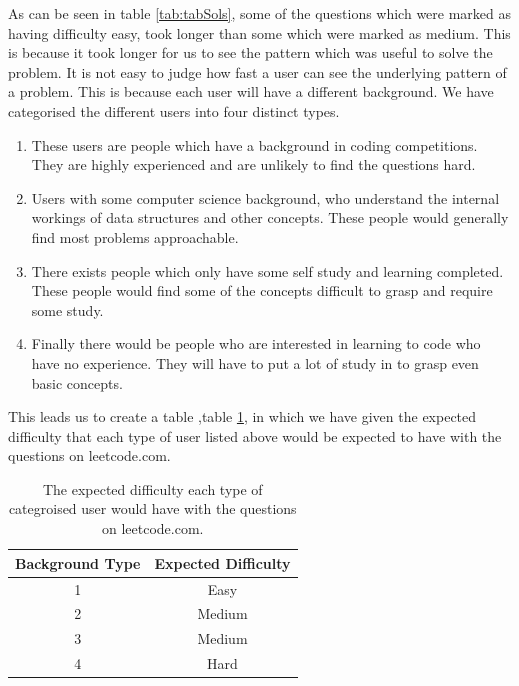 \documentclass[10pt,twocolumn]{IEEEtran}
\begin{document}
\par As can be seen in table \ref{tab:tabSols}, some of the questions which were marked as having difficulty easy, took longer than some which were marked as medium. This is because it took longer for us to see the pattern which was useful to solve the problem. It is not easy to judge how fast a user can see the underlying pattern of a problem. This is because each user will have a different background. We have categorised the different users into four distinct types. 
\begin{enumerate}
\item{These users are people which have a background in coding competitions. They are highly experienced and are unlikely to find the questions hard.}
\item{Users with some computer science background, who understand the internal workings of data structures and other concepts. These people would generally find most problems approachable.}
\item{There exists people which only have some self study and learning completed. These people would find some of the concepts difficult to grasp and require some study.}
\item{Finally there would be people who are interested in learning to code who have no experience. They will have to put a lot of study in to grasp even basic concepts.}
\end{enumerate}
This leads us to create a table ,table \ref{tab:difficulty}, in which we have given the expected difficulty that each type of user listed above would be expected to have with the questions on leetcode.com.
\begin{table}[t]
\centering
	\begin{tabular}{| c | c |} \hline
		   Background Type &Expected Difficulty \\ \hline
		1 & Easy \\ \hline
		2 & Medium \\ \hline
		3 & Medium  \\ \hline
		4 & Hard  \\ \hline
	\end{tabular}
	\caption{The expected difficulty each type of categroised user would have with the questions on leetcode.com.}
	\label{tab:difficulty}
\end{table}
\end{document}
